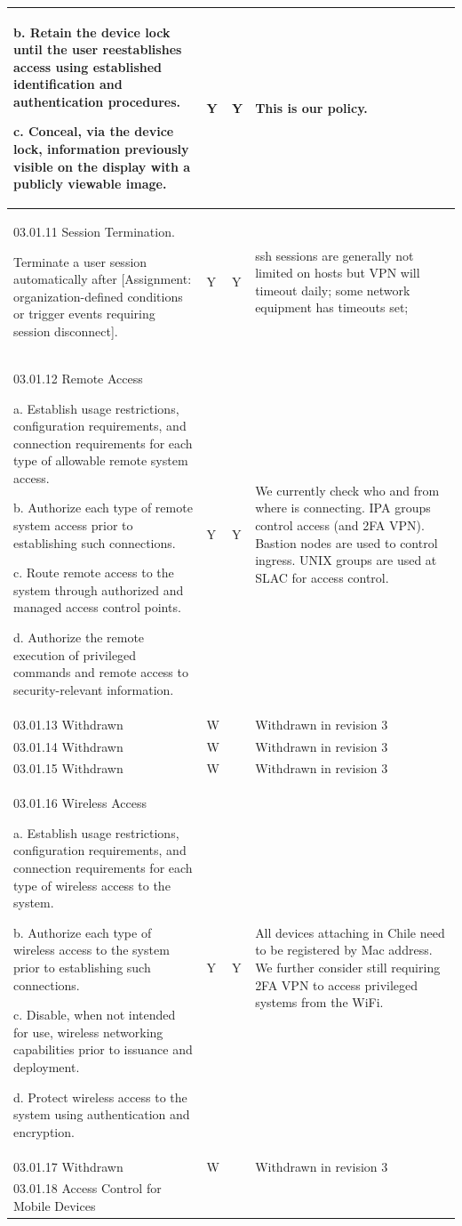 \begin{longtable} {|p{}|p{}|p{}|p{} |}
{b. Retain the device lock until the user reestablishes access using established identification and authentication procedures.

c. Conceal, via the device lock, information previously visible on the display with a publicly viewable image.}&{Y}&{Y}&{This is our policy.} \\ \hline
{03.01.11 Session Termination.

Terminate a user session automatically after [Assignment: organization-defined
conditions or trigger events requiring session disconnect].}&{Y}&{Y}&{ssh sessions are generally not limited on hosts but VPN will timeout daily; some network equipment has timeouts set;} \\ \hline
{03.01.12 Remote Access

a. Establish usage restrictions, configuration requirements, and connection requirements for each type of allowable remote system access.

b. Authorize each type of remote system access prior to establishing such connections.

c. Route remote access to the system through authorized and managed access control points.

d. Authorize the remote execution of privileged commands and remote access to security-relevant information.}&{Y}&{Y}&{We currently check who and from where is connecting. IPA groups control access (and 2FA VPN). Bastion nodes are used to control ingress. UNIX groups are used at SLAC for access control.} \\ \hline
{03.01.13 Withdrawn}&{W}&{}&{Withdrawn in revision 3} \\ \hline
{03.01.14 Withdrawn}&{W}&{}&{Withdrawn in revision 3} \\ \hline
{03.01.15 Withdrawn}&{W}&{}&{Withdrawn in revision 3} \\ \hline
{03.01.16 Wireless Access

a. Establish usage restrictions, configuration requirements, and connection requirements for each type of wireless access to the system.

b. Authorize each type of wireless access to the system prior to establishing such connections.

c. Disable, when not intended for use, wireless networking capabilities prior to issuance and deployment.

d. Protect wireless access to the system using authentication and encryption.}&{Y}&{Y}&{All devices attaching in Chile need to be registered by Mac address. We  further consider still requiring 2FA VPN to access privileged systems from the WiFi.} \\ \hline
{03.01.17 Withdrawn}&{W}&{}&{Withdrawn in revision 3} \\ \hline
{03.01.18 Access Control for Mobile Devices

}
\end{longtable}
